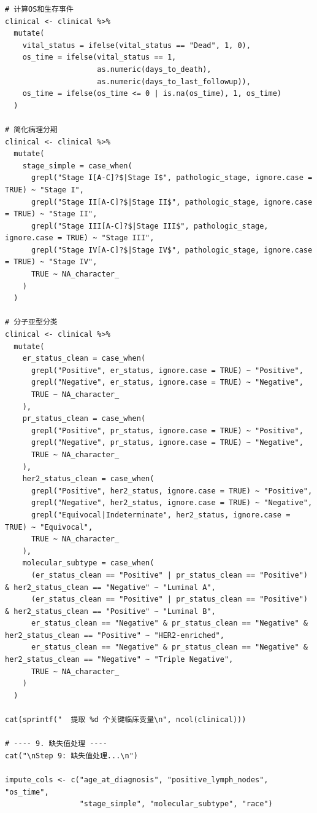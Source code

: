 \documentclass[12pt,a4paper]{ctexart}
\begin{document}
\begin{lstlisting}[caption={01_data_preprocessing}, basicstyle=\ttfamily\scriptsize]
# 计算OS和生存事件
clinical <- clinical %>%
  mutate(
    vital_status = ifelse(vital_status == "Dead", 1, 0),
    os_time = ifelse(vital_status == 1,
                     as.numeric(days_to_death),
                     as.numeric(days_to_last_followup)),
    os_time = ifelse(os_time <= 0 | is.na(os_time), 1, os_time)
  )

# 简化病理分期
clinical <- clinical %>%
  mutate(
    stage_simple = case_when(
      grepl("Stage I[A-C]?$|Stage I$", pathologic_stage, ignore.case = TRUE) ~ "Stage I",
      grepl("Stage II[A-C]?$|Stage II$", pathologic_stage, ignore.case = TRUE) ~ "Stage II",
      grepl("Stage III[A-C]?$|Stage III$", pathologic_stage, ignore.case = TRUE) ~ "Stage III",
      grepl("Stage IV[A-C]?$|Stage IV$", pathologic_stage, ignore.case = TRUE) ~ "Stage IV",
      TRUE ~ NA_character_
    )
  )

# 分子亚型分类
clinical <- clinical %>%
  mutate(
    er_status_clean = case_when(
      grepl("Positive", er_status, ignore.case = TRUE) ~ "Positive",
      grepl("Negative", er_status, ignore.case = TRUE) ~ "Negative",
      TRUE ~ NA_character_
    ),
    pr_status_clean = case_when(
      grepl("Positive", pr_status, ignore.case = TRUE) ~ "Positive",
      grepl("Negative", pr_status, ignore.case = TRUE) ~ "Negative",
      TRUE ~ NA_character_
    ),
    her2_status_clean = case_when(
      grepl("Positive", her2_status, ignore.case = TRUE) ~ "Positive",
      grepl("Negative", her2_status, ignore.case = TRUE) ~ "Negative",
      grepl("Equivocal|Indeterminate", her2_status, ignore.case = TRUE) ~ "Equivocal",
      TRUE ~ NA_character_
    ),
    molecular_subtype = case_when(
      (er_status_clean == "Positive" | pr_status_clean == "Positive") & her2_status_clean == "Negative" ~ "Luminal A",
      (er_status_clean == "Positive" | pr_status_clean == "Positive") & her2_status_clean == "Positive" ~ "Luminal B",
      er_status_clean == "Negative" & pr_status_clean == "Negative" & her2_status_clean == "Positive" ~ "HER2-enriched",
      er_status_clean == "Negative" & pr_status_clean == "Negative" & her2_status_clean == "Negative" ~ "Triple Negative",
      TRUE ~ NA_character_
    )
  )

cat(sprintf("  提取 %d 个关键临床变量\n", ncol(clinical)))

# ---- 9. 缺失值处理 ----
cat("\nStep 9: 缺失值处理...\n")

impute_cols <- c("age_at_diagnosis", "positive_lymph_nodes", "os_time",
                 "stage_simple", "molecular_subtype", "race")


\end{lstlisting}
\end{document}
